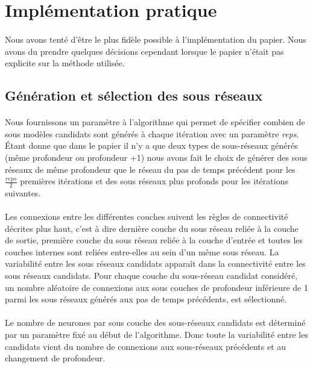 \documentclass[11 pt]{article}
\begin{document}
\section{Implémentation pratique}
\paragraph{}Nous avons tenté d’être le plus fidèle possible à l’implémentation du papier. Nous avons du prendre quelques décisions cependant lorsque le papier n’était pas explicite sur la méthode utilisée.
\subsection{Génération et sélection des sous réseaux}
\paragraph{}Nous fournissons un paramètre à l'algorithme qui permet de spécifier combien de sous modèles candidats sont générés \`a chaque itération avec un paramètre \emph{reps}. Étant donne que dans le papier il n'y a que deux types de sous-réseaux générés (même profondeur ou profondeur +1) nous avons fait le choix de générer des sous réseaux de même profondeur que le réseau du pas de temps précédent pour les $\frac{reps}{2}$ premières itérations et des sous réseaux plus profonds pour les itérations suivantes.
\paragraph{}Les connexions entre les différentes couches suivent les règles de connectivité décrites plus haut, c'est \`a dire dernière couche du sous réseau reliée à la couche de sortie, première couche du sous réseau reliée à la couche d’entrée et toutes les couches internes sont reliées entre-elles au sein d'un même sous réseau. La variabilité entre les sous réseaux candidats apparaît dans la connectivité entre les sous réseaux candidats. Pour chaque couche du sous-réseau candidat considéré, un nombre aléatoire de connexions aux sous couches de profondeur inférieure de 1 parmi les sous réseaux générés aux pas de temps précédents, est sélectionné.

\paragraph{}Le nombre de neurones par sous couche des sous-réseaux candidats est déterminé par un paramètre fix\'e au début de l'algorithme. Donc toute la variabilité entre les candidats vient du nombre de connexions aux sous-réseaux précédents et au changement de profondeur.
\end{document}
